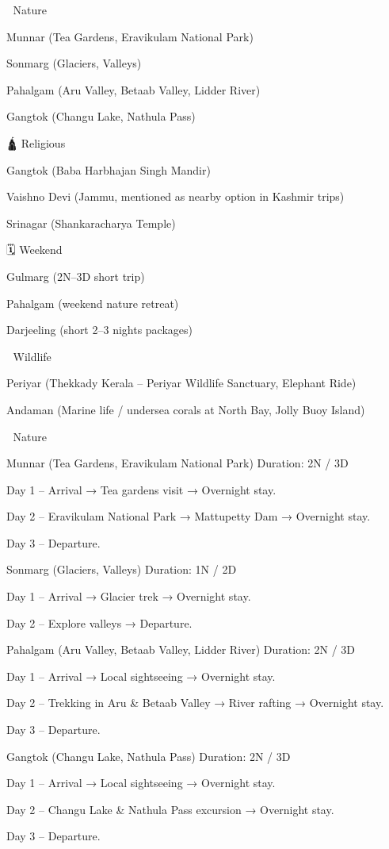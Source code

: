
🌿 Nature

Munnar (Tea Gardens, Eravikulam National Park)

Sonmarg (Glaciers, Valleys)

Pahalgam (Aru Valley, Betaab Valley, Lidder River)

Gangtok (Changu Lake, Nathula Pass)


🛕 Religious

Gangtok (Baba Harbhajan Singh Mandir)

Vaishno Devi (Jammu, mentioned as nearby option in Kashmir trips)

Srinagar (Shankaracharya Temple)

🗓 Weekend

Gulmarg (2N–3D short trip)

Pahalgam (weekend nature retreat)

Darjeeling (short 2–3 nights packages)


🐅 Wildlife

Periyar (Thekkady Kerala – Periyar Wildlife Sanctuary, Elephant Ride)

Andaman (Marine life / undersea corals at North Bay, Jolly Buoy Island)

🌿 Nature

Munnar (Tea Gardens, Eravikulam National Park)
Duration: 2N / 3D

Day 1 – Arrival → Tea gardens visit → Overnight stay.

Day 2 – Eravikulam National Park → Mattupetty Dam → Overnight stay.

Day 3 – Departure.

Sonmarg (Glaciers, Valleys)
Duration: 1N / 2D

Day 1 – Arrival → Glacier trek → Overnight stay.

Day 2 – Explore valleys → Departure.

Pahalgam (Aru Valley, Betaab Valley, Lidder River)
Duration: 2N / 3D

Day 1 – Arrival → Local sightseeing → Overnight stay.

Day 2 – Trekking in Aru & Betaab Valley → River rafting → Overnight stay.

Day 3 – Departure.

Gangtok (Changu Lake, Nathula Pass)
Duration: 2N / 3D

Day 1 – Arrival → Local sightseeing → Overnight stay.

Day 2 – Changu Lake & Nathula Pass excursion → Overnight stay.

Day 3 – Departure.

